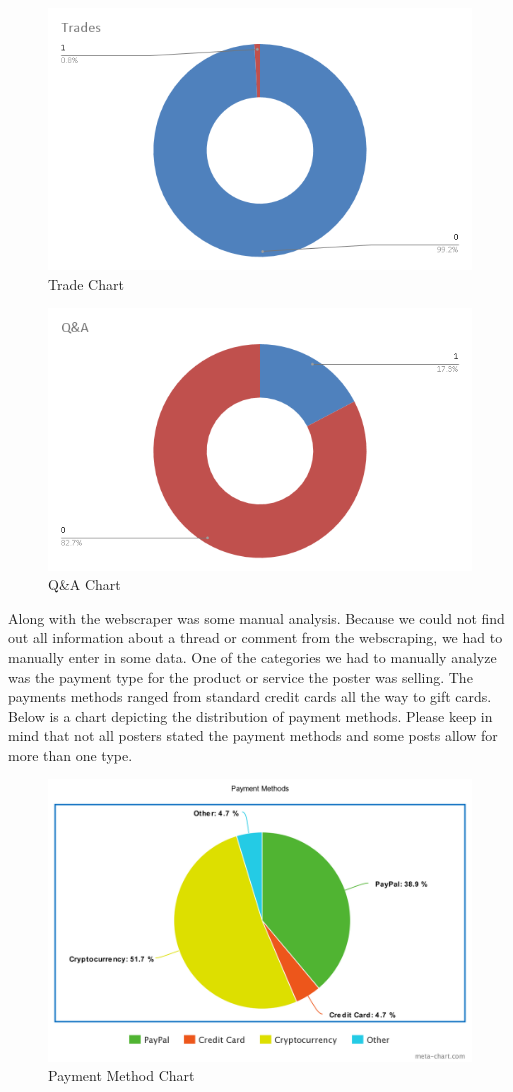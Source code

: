 \documentclass[sigconf]{acmart}
\begin{document}
\begin{figure}[h]
	\centering
	\includegraphics[width=.5\textwidth]{TradeChart.png}
	\caption{Trade Chart}
\end{figure}

\begin{figure}[h]
	\centering
	\includegraphics[width=.5\textwidth]{Q&AChart.png}
	\caption{Q\&A Chart}
\end{figure}

Along with the webscraper was some manual analysis. Because we could not find out all information about a thread or comment from the
webscraping, we had to manually enter in some data. One of the categories we had to manually analyze was the payment type for the
product or service the poster was selling. The payments methods ranged from standard credit cards all the way to gift cards. Below is 
a chart depicting the distribution of payment methods. Please keep in mind that not all posters stated the payment methods and some
posts allow for more than one type.

\begin{figure}[h]
	\centering
	\includegraphics[width=.5\textwidth]{PaymentChart.png}
	\caption{Payment Method Chart}
\end{figure}
\end{document}
